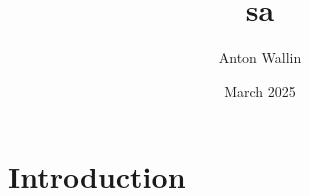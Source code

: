 \documentclass{article}
\title{sa}
\author{Anton Wallin}
\date{March 2025}
\begin{document}
\maketitle

\section{Introduction}
\end{document}
